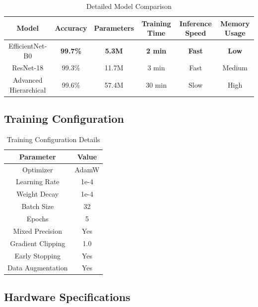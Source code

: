 \begin{table}[htbp]
\caption{Detailed Model Comparison}
\label{tab:model_comparison_detailed}
\begin{center}
\begin{tabular}{|c|c|c|c|c|c|}
\hline
\textbf{Model} & \textbf{Accuracy} & \textbf{Parameters} & \textbf{Training Time} & \textbf{Inference Speed} & \textbf{Memory Usage} \\
\hline
EfficientNet-B0 & \textbf{99.7\%} & \textbf{5.3M} & \textbf{2 min} & \textbf{Fast} & \textbf{Low} \\
\hline
ResNet-18 & 99.3\% & 11.7M & 3 min & Fast & Medium \\
\hline
Advanced Hierarchical & 99.6\% & 57.4M & 30 min & Slow & High \\
\hline
\end{tabular}
\end{center}
\end{table}

\subsection{Training Configuration}

\begin{table}[htbp]
\caption{Training Configuration Details}
\label{tab:training_config}
\begin{center}
\begin{tabular}{|c|c|}
\hline
\textbf{Parameter} & \textbf{Value} \\
\hline
Optimizer & AdamW \\
\hline
Learning Rate & 1e-4 \\
\hline
Weight Decay & 1e-4 \\
\hline
Batch Size & 32 \\
\hline
Epochs & 5 \\
\hline
Mixed Precision & Yes \\
\hline
Gradient Clipping & 1.0 \\
\hline
Early Stopping & Yes \\
\hline
Data Augmentation & Yes \\
\hline
\end{tabular}
\end{center}
\end{table}

\subsection{Hardware Specifications}

